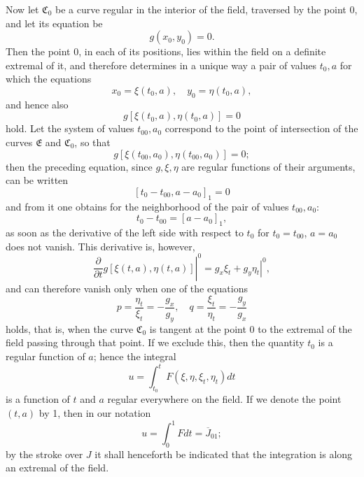 \documentclass[11pt,a4paper,leqno]{article}
\begin{document}
Now let $\mathfrak{C}_0$ be a curve regular in the interior of the field, traversed by the point 0, and let its equation be
\[
g(x_0,y_0)=0.
\]
Then the point 0, in each of its positions, lies within the field on a definite extremal of it, and therefore determines in a unique way a pair of values $t_0,a$ for which the equations
\[
x_0=\xi(t_0,a),\quad y_0=\eta(t_0,a),
\]
and hence also
\[
g[\xi(t_0,a),\eta(t_0,a)]=0
\]
hold. Let the system of values $t_{00},a_0$ correspond to the point of intersection of the curves $\mathfrak{E}$ and $\mathfrak{C}_0$, so that
\[
g[\xi(t_{00},a_0),\eta(t_{00},a_0)]=0;
\]
then the preceding equation, since $g,\xi,\eta$ are regular functions of their arguments, can be written
\[
[t_0-t_{00},a-a_0]_1=0
\]
and from it one obtains for the neighborhood of the pair of values $t_{00},a_0$:
\[
t_0-t_{00}=[a-a_0]_1,
\]
as soon as the derivative of the left side with respect to $t_0$ for $t_0=t_{00}$, $a=a_0$ does not vanish. This derivative is, however,
\[
\left.\frac{\partial}{\partial t}g[\xi(t,a),\eta(t,a)]\right|^0
=\left.g_x\xi_t+g_y\eta_t\right|^0,
\]
and can therefore vanish only when one of the equations
\[
p=\frac{\eta_t}{\xi_t}=-\frac{g_x}{g_y},
\quad q=\frac{\xi_t}{\eta_t}=-\frac{g_y}{g_x}
\]
holds, that is, when the curve $\mathfrak{C}_0$ is tangent at the point 0 to the extremal of the field passing through that point. If we exclude this, then the quantity $t_0$ is a regular function of $a$; hence the integral
\[
u=\int_{t_0}^{t}F(\xi,\eta,\xi_t,\eta_t)dt
\]
is a function of $t$ and $a$ regular everywhere on the field. If we denote the point $(t,a)$ by 1, then in our notation
\[
u=\int_0^1 Fdt=\overline{J}_{01};
\]
by the stroke over $J$ it shall henceforth be indicated that the integration is along an extremal of the field.
\end{document}
